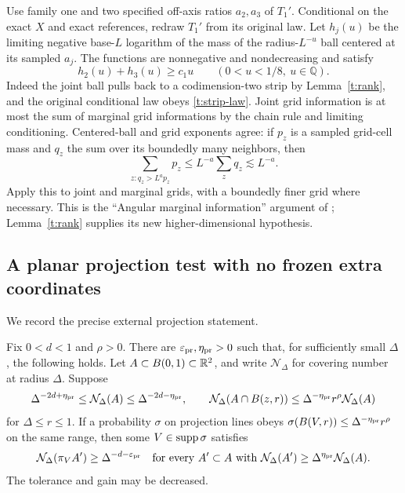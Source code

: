 Use family one and two specified off-axis ratios $a_2,a_3$ of $T_1'$.
Conditional on the exact $X$ and exact references, redraw $T_1'$ from
its original law.  Let $h_j(u)$ be the limiting negative base-$L$
logarithm of the mass of the radius-$L^{-u}$ ball centered at its sampled
$a_j$.  The functions are nonnegative and nondecreasing and satisfy
\begin{equation}\label{t:angular-sum}
 h_2(u)+h_3(u)\ge c_1u\qquad(0<u<1/8,\ u\in\mathbb Q).
\end{equation}
Indeed the joint ball pulls back to a codimension-two strip by
Lemma~\ref{t:rank}, and the original conditional law obeys
\eqref{t:strip-law}.  Joint grid information is at most the sum of
marginal grid informations by the chain rule and limiting conditioning.
Centered-ball and grid exponents agree: if $p_z$ is a sampled grid-cell
mass and $q_z$ the sum over its boundedly many neighbors, then
\[
 \sum_{z:q_z>L^a p_z}p_z
       \le L^{-a}\sum_zq_z\lesssim L^{-a}.
\]
Apply this to joint and marginal grids, with a boundedly finer grid
where necessary.  This is the ``Angular marginal information'' argument
of \citet[Section~3]{PSE2026}; Lemma~\ref{t:rank} supplies its new
higher-dimensional hypothesis.

\subsection{A planar projection test with no frozen extra coordinates}

We record the precise external projection statement.

\begin{lemma}\label{t:projection}
Fix $0<d<1$ and $\rho>0$.  There are $\varepsilon_{\rm pr},\eta_{\rm pr}>0$
such that, for sufficiently small $\Delta$, the following holds.
Let $A\subset B(0,1)\subset\mathbb R^2$, and write $\mathcal N_\Delta$ for
covering number at radius $\Delta$.  Suppose
\[
 \Delta^{-2d+\eta_{\rm pr}}\le\mathcal N_\Delta(A)
       \le\Delta^{-2d-\eta_{\rm pr}},\qquad
 \mathcal N_\Delta(A\cap B(z,r))
       \le\Delta^{-\eta_{\rm pr}}r^\rho\mathcal N_\Delta(A)
\]
for $\Delta\le r\le1$.  If a probability $\sigma$ on projection lines
obeys $\sigma(B(V,r))\le\Delta^{-\eta_{\rm pr}}r^\rho$ on the same
range, then some $V\in\operatorname{supp}\sigma$ satisfies
\[
 \mathcal N_\Delta(\pi_VA')\ge\Delta^{-d-\varepsilon_{\rm pr}}
 \quad\text{for every }A'\subset A\text{ with }
 \mathcal N_\Delta(A')\ge\Delta^{\eta_{\rm pr}}\mathcal N_\Delta(A).
\]
The tolerance and gain may be decreased.
\end{lemma}

